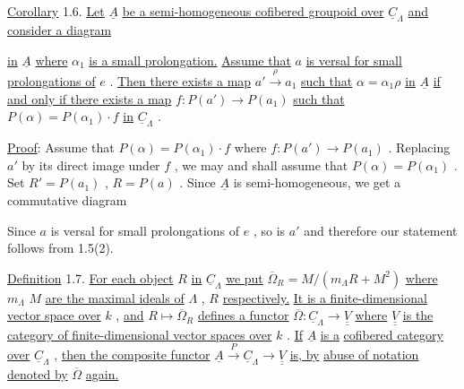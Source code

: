 \underline{Corollary} 1.6.   \underline{Let}  $\underline{A}$  \underline{be a semi-homogeneous cofibered groupoid over}  $\underline{C}_{\Lambda}$ \underline{and consider a diagram}

\begin{center}
\end{center}
\underline{in}  $\underline{A}$  \underline{where}  $\alpha_1$  \underline{is a small prolongation.} \underline{Assume that}  $a$  \underline{is versal for small} \underline{prolongations of}  $e$  . \underline{Then there exists a map}  $a' \xrightarrow{\ \rho\ } a_1$  \underline{such that}  $\alpha = \alpha_1 \rho$ \underline{in}  $\underline{A}$  \underline{if and only if there exists a map}  $f : P(a') \rightarrow P(a_1)$  \underline{such that} $P(\alpha) = P(\alpha_1)\cdot f$  \underline{in}  $\underline{C}_{\Lambda}$  .

\underline{Proof}:  Assume that  $P(\alpha) = P(\alpha_1)\cdot f$  where  $f : P(a') \rightarrow P(a_1)$  . Replacing  $a'$ by its direct image under  $f$  , we may and shall assume that  $P(\alpha) = P(\alpha_1)$  . Set  $R' = P(a_1)$  ,  $R = P(a)$  . Since  $\underline{A}$  is semi-homogeneous, we get a commutative diagram

\begin{center}
\end{center}
Since  $a$  is versal for small prolongations of  $e$  , so is  $a'$ and therefore our statement follows from 1.5(2).

\underline{Definition} 1.7.   \underline{For each object}  $R$  \underline{in}  $\underline{C}_{\Lambda}$ \underline{we put}  $\overline{\Omega}_R = M/(m_{\Lambda}R+M^2)$  \underline{where}  \underline{$m_{\Lambda}$} $M$  \underline{are the maximal ideals of}  $\Lambda$ ,  $R$  \underline{respectively.} \underline{It is a finite-dimensional vector space over}  $k$  , \underline{and}  $R \longmapsto \overline{\Omega}_R$  \underline{defines a functor}  $\overline{\Omega} : \underline{C}_{\Lambda} \rightarrow \underline{\underline{V}}$  \underline{where} $\underline{\underline{V}}$  \underline{is the category of finite-dimensional vector spaces over}  $k$  . \underline{If}  $\underline{A}$  \underline{is a} \underline{cofibered category over}  $\underline{C}_{\Lambda}$  , \underline{then the composite functor}  $\underline{A} \xrightarrow{\ P\ } \underline{C}_{\Lambda} \rightarrow \underline{\underline{V}}$  \underline{is, by} \underline{abuse of notation denoted by}  $\overline{\Omega}$  \underline{again.}

